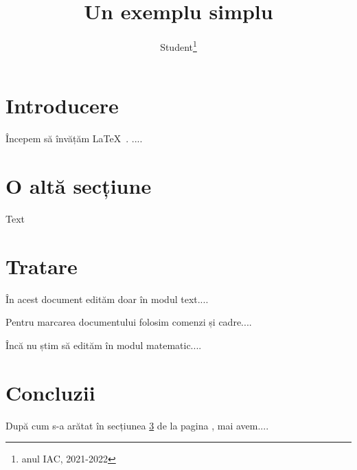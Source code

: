 \documentclass{article}
\title{Un exemplu simplu}
\author{Student\footnote{anul IAC, 2021-2022}}
\date{}
\begin{document}
\maketitle
\section{Introducere}\label{sec:intro}
Începem să învățăm \LaTeX\ . ....
\section{O altă secțiune}
Text
\section{Tratare}\label{sec:trat}
În acest document edităm doar în modul text....\par
Pentru marcarea documentului folosim comenzi și cadre....\par Încă nu știm să edităm în modul matematic....
\section{Concluzii} 
După cum s-a arătat în secțiunea \ref{sec:trat} de la pagina \pageref{sec:trat}, mai avem.... 
\end{document}
